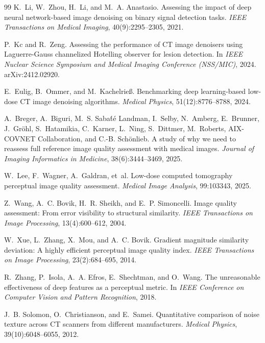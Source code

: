 \documentclass[letterpaper]{article} %
\newif\ifincludeappendix
\begin{document}
\begin{thebibliography}{99}
K.~Li, W.~Zhou, H.~Li, and M.~A. Anastasio.
\newblock Assessing the impact of deep neural network-based image denoising on
  binary signal detection tasks.
\newblock \emph{IEEE Transactions on Medical Imaging}, 40(9):2295--2305, 2021.

P.~Kc and R.~Zeng.
\newblock Assessing the performance of {CT} image denoisers using
  {Laguerre-Gauss} channelized {Hotelling} observer for lesion detection.
\newblock In \emph{IEEE Nuclear Science Symposium and Medical Imaging Conference
  (NSS/MIC)}, 2024.
\newblock arXiv:2412.02920.

E.~Eulig, B.~Ommer, and M.~Kachelrie\ss.
\newblock Benchmarking deep learning-based low-dose {CT} image denoising
  algorithms.
\newblock \emph{Medical Physics}, 51(12):8776--8788, 2024.

A.~Breger, A.~Biguri, M.~S. Saba\'t\'e Landman, I.~Selby, N.~Amberg,
  E.~Brunner, J.~Gr\"ohl, S.~Hatamikia, C.~Karner, L.~Ning, S.~Dittmer,
  M.~Roberts, AIX-COVNET Collaboration, and C.-B. Sch\"onlieb.
\newblock A study of why we need to reassess full reference image quality
  assessment with medical images.
\newblock \emph{Journal of Imaging Informatics in Medicine},
  38(6):3444--3469, 2025.

W.~Lee, F.~Wagner, A.~Galdran, et~al.
\newblock Low-dose computed tomography perceptual image quality assessment.
\newblock \emph{Medical Image Analysis}, 99:103343, 2025.

Z.~Wang, A.~C. Bovik, H.~R. Sheikh, and E.~P. Simoncelli.
\newblock Image quality assessment: From error visibility to structural
  similarity.
\newblock \emph{IEEE Transactions on Image Processing}, 13(4):600--612, 2004.

W.~Xue, L.~Zhang, X.~Mou, and A.~C. Bovik.
\newblock Gradient magnitude similarity deviation: A highly efficient perceptual
  image quality index.
\newblock \emph{IEEE Transactions on Image Processing}, 23(2):684--695, 2014.

R.~Zhang, P.~Isola, A.~A. Efros, E.~Shechtman, and O.~Wang.
\newblock The unreasonable effectiveness of deep features as a perceptual
  metric.
\newblock In \emph{IEEE Conference on Computer Vision and Pattern Recognition},
  2018.

J.~B. Solomon, O.~Christianson, and E.~Samei.
\newblock Quantitative comparison of noise texture across {CT} scanners from
  different manufacturers.
\newblock \emph{Medical Physics}, 39(10):6048--6055, 2012.

\end{thebibliography}

\ifincludeappendix

\fi
\end{document}
